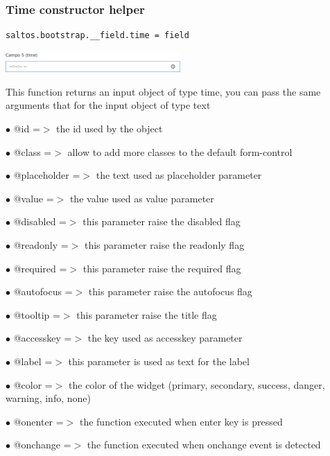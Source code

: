\documentclass[a4paper]{article}
\begin{document}
\hypertarget{toc56}{}
\subsubsection{Time constructor helper}

\begin{lstlisting}
saltos.bootstrap.__field.time = field
\end{lstlisting}

\begin{center}\includegraphics[width=0.5\textwidth]{../ujest/snaps/test-bootstrap-js-bootstrap-campo-5-time-1-snap.png}\end{center}

This function returns an input object of type time, you can pass the same arguments
that for the input object of type text

\begin{compactitem}
\item[\color{myblue}$\bullet$] @id          =$>$ the id used by the object
\item[\color{myblue}$\bullet$] @class       =$>$ allow to add more classes to the default form-control
\item[\color{myblue}$\bullet$] @placeholder =$>$ the text used as placeholder parameter
\item[\color{myblue}$\bullet$] @value       =$>$ the value used as value parameter
\item[\color{myblue}$\bullet$] @disabled    =$>$ this parameter raise the disabled flag
\item[\color{myblue}$\bullet$] @readonly    =$>$ this parameter raise the readonly flag
\item[\color{myblue}$\bullet$] @required    =$>$ this parameter raise the required flag
\item[\color{myblue}$\bullet$] @autofocus   =$>$ this parameter raise the autofocus flag
\item[\color{myblue}$\bullet$] @tooltip     =$>$ this parameter raise the title flag
\item[\color{myblue}$\bullet$] @accesskey   =$>$ the key used as accesskey parameter
\item[\color{myblue}$\bullet$] @label       =$>$ this parameter is used as text for the label
\item[\color{myblue}$\bullet$] @color       =$>$ the color of the widget (primary, secondary, success, danger, warning, info, none)
\item[\color{myblue}$\bullet$] @onenter     =$>$ the function executed when enter key is pressed
\item[\color{myblue}$\bullet$] @onchange    =$>$ the function executed when onchange event is detected
\end{compactitem}
\end{document}
